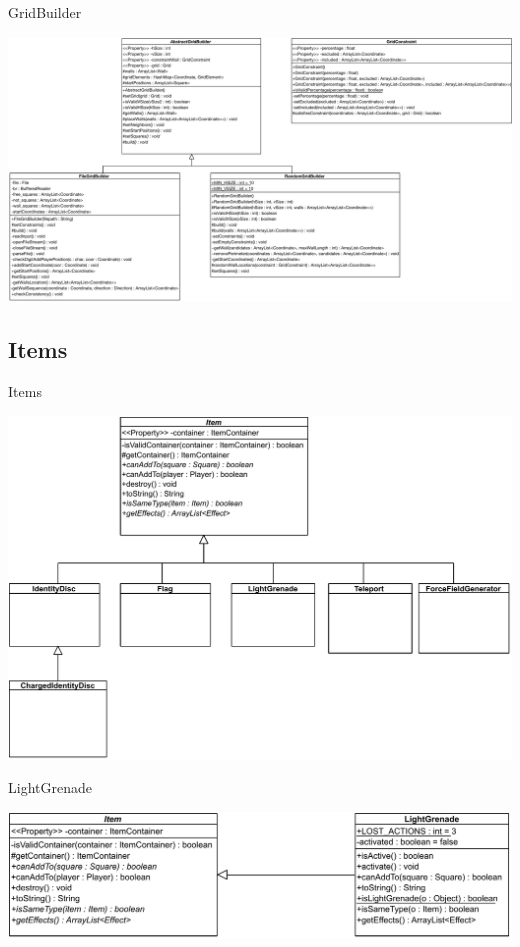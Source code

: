 \documentclass[11pt,t]{beamer}
\begin{document}
\begin{frame}{GridBuilder}
\begin{center}
\includegraphics[width=1\linewidth]{images/gridbuilder}
\end{center}
\end{frame}

\subsection{Items}

\begin{frame}{Items}
\begin{center}
\includegraphics[width=0.7\linewidth]{images/items}
\end{center}
\end{frame}

\begin{frame}{LightGrenade}
\vspace{0.5in}
\begin{center}
\includegraphics[width=0.9\linewidth]{images/lightgrenade}
\end{center}
\end{frame}
\end{document}
